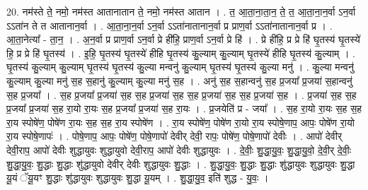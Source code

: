 \documentclass[17pt]{extarticle}
\begin{document}
20. नम॑स्ते ते॒ नमो॒ नम॑स्त आतानातान ते॒ नमो॒ नम॑स्त आतान । . त॒ आ॒ता॒ना॒ता॒न॒ ते॒ त॒ आ॒ता॒ना॒न॒र्वा ऽन॒र्वा ऽऽता॑न ते त आतानान॒र्वा । . आ॒ता॒ना॒न॒र्वा ऽन॒र्वा ऽऽता॑नातानान॒र्वा प्र प्राण॒र्वा ऽऽता॑नातानान॒र्वा प्र । . आ॒ता॒नेत्या᳚ - ता॒न॒ । . अ॒न॒र्वा प्र प्राण॒र्वा ऽन॒र्वा प्रे ही॑हि॒ प्राण॒र्वा ऽन॒र्वा प्रे हि॑ । . प्रे ही॑हि॒ प्र प्रे हि॑ घृ॒तस्य॑ घृ॒तस्ये॑ हि॒ प्र प्रे हि॑ घृ॒तस्य॑ । . इ॒हि॒ घृ॒तस्य॑ घृ॒तस्ये॑ हीहि घृ॒तस्य॑ कु॒ल्याम् कु॒ल्याम् घृ॒तस्ये॑ हीहि घृ॒तस्य॑ कु॒ल्याम् । . घृ॒तस्य॑ कु॒ल्याम् कु॒ल्याम् घृ॒तस्य॑ घृ॒तस्य॑ कु॒ल्या मन्वनु॑ कु॒ल्याम् घृ॒तस्य॑ घृ॒तस्य॑ कु॒ल्या मनु॑ । . कु॒ल्या मन्वनु॑ कु॒ल्याम् कु॒ल्या मनु॑ स॒ह स॒हानु॑ कु॒ल्याम् कु॒ल्या मनु॑ स॒ह । . अनु॑ स॒ह स॒हान्वनु॑ स॒ह प्र॒जया᳚ प्र॒जया॑ स॒हान्वनु॑ स॒ह प्र॒जया᳚ । . स॒ह प्र॒जया᳚ प्र॒जया॑ स॒ह स॒ह प्र॒जया॑ स॒ह स॒ह प्र॒जया॑ स॒ह स॒ह प्र॒जया॑ स॒ह । . प्र॒जया॑ स॒ह स॒ह प्र॒जया᳚ प्र॒जया॑ स॒ह रा॒यो रा॒यः स॒ह प्र॒जया᳚ प्र॒जया॑ स॒ह रा॒यः । . प्र॒जयेति॑ प्र - जया᳚ । . स॒ह रा॒यो रा॒यः स॒ह स॒ह रा॒य स्पोषे॑ण॒ पोषे॑ण रा॒यः स॒ह स॒ह रा॒य स्पोषे॑ण । . रा॒य स्पोषे॑ण॒ पोषे॑ण रा॒यो रा॒य स्पोषे॒णाप॒ आपः॒ पोषे॑ण रा॒यो रा॒य स्पोषे॒णापः॑ । . पोषे॒णाप॒ आपः॒ पोषे॑ण॒ पोषे॒णापो॑ देवीर् देवी॒ रापः॒ पोषे॑ण॒ पोषे॒णापो॑ देवीः । . आपो॑ देवीर् देवी॒राप॒ आपो॑ देवीः शुद्धायुवः शुद्धायुवो देवी॒राप॒ आपो॑ देवीः शुद्धायुवः । . दे॒वीः॒ शु॒द्धा॒यु॒वः॒ शु॒द्धा॒यु॒वो॒ दे॒वी॒र् दे॒वीः॒ शु॒द्धा॒यु॒वः॒ शु॒द्धाः शु॒द्धाः शु॑द्धायुवो देवीर् देवीः शुद्धायुवः शु॒द्धाः । . शु॒द्धा॒यु॒वः॒ शु॒द्धाः शु॒द्धाः शु॑द्धायुवः शुद्धायुवः शु॒द्धा यू॒यं ॅयू॒यꣳ शु॒द्धाः शु॑द्धायुवः शुद्धायुवः शु॒द्धा यू॒यम् । . शु॒द्धा॒यु॒व॒ इति॑ शुद्ध - यु॒वः॒ । \newline
\end{document}
